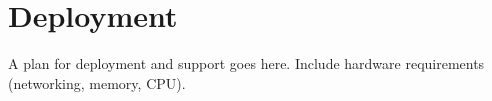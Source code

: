 \chapter{Deployment}

\begin{fixme}
A plan for deployment and support goes here. Include hardware
requirements (networking, memory, CPU).
\end{fixme}

